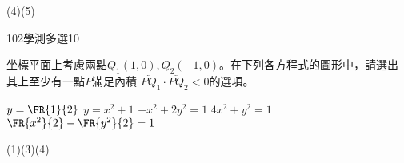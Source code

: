 \begin{QUESTIONS}
\begin{QUESTION}
\begin{QBODY}
\begin{QOPS}
			\end{QOPS}
        \end{QBODY}
        \begin{QFROMS}
        \end{QFROMS}
        \begin{QTAGS}\end{QTAGS}
        \begin{QANS}
            (4)(5)
        \end{QANS}
        \begin{QSOLLIST}
        \end{QSOLLIST}
        \begin{QEMPTYSPACE}
        \end{QEMPTYSPACE}
    \end{QUESTION}
    \begin{QUESTION}
        \begin{ExamInfo}{102}{學測}{多選}{10}
        \end{ExamInfo}
        \begin{ExamAnsRateInfo}{36}{60}{30}{18}
        \end{ExamAnsRateInfo}
        \begin{QBODY}
            坐標平面上考慮兩點${{Q}_{1}}(1,0),{{Q}_{2}}(-1,0)$。在下列各方程式的圖形中，請選出其上至少有一點$P$滿足內積 $\lvec{PQ_{1}}\cdot \lvec{PQ_{2}}<0$的選項。
		\begin{QOPS}
			\QOP $y=\FR{1}{2}$  
			\QOP $y={{x}^{2}}+1$ 
			\QOP $-{{x}^{2}}+2{{y}^{2}}=1$
			\QOP $4{{x}^{2}}+{{y}^{2}}=1$
			\QOP $\FR{{{x}^{2}}}{2}-\FR{{{y}^{2}}}{2}=1$
		\end{QOPS}
        \end{QBODY}
        \begin{QFROMS}
        \end{QFROMS}
        \begin{QTAGS}\end{QTAGS}
        \begin{QANS}
            (1)(3)(4)
        \end{QANS}
        \begin{QSOLLIST}
        \end{QSOLLIST}
        \begin{QEMPTYSPACE}
        \end{QEMPTYSPACE}
    \end{QUESTION}
    \begin{QUESTION}

\end{QUESTION}
\end{QUESTIONS}

